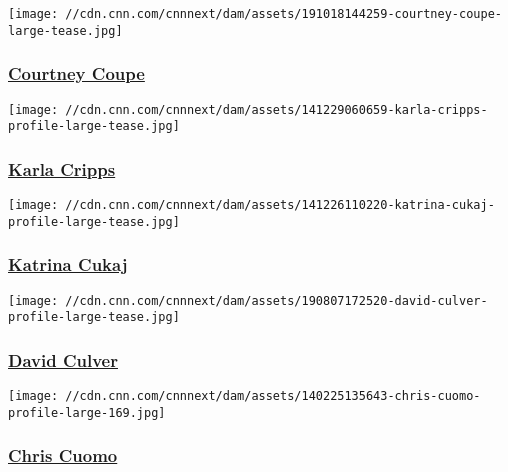 \href{/profiles/courtney-coupe}{}

\texttt{[image: //cdn.cnn.com/cnnnext/dam/assets/191018144259-courtney-coupe-large-tease.jpg]}

\hypertarget{courtney-coupe}{%
\subsubsection{\texorpdfstring{\href{/profiles/courtney-coupe}{Courtney
Coupe}}{Courtney Coupe}}\label{courtney-coupe}}

\href{/profiles/karla-cripps}{}

\texttt{[image: //cdn.cnn.com/cnnnext/dam/assets/141229060659-karla-cripps-profile-large-tease.jpg]}

\hypertarget{karla-cripps}{%
\subsubsection{\texorpdfstring{\href{/profiles/karla-cripps}{Karla
Cripps}}{Karla Cripps}}\label{karla-cripps}}

\href{/profiles/katrina-cukaj-profile}{}

\texttt{[image: //cdn.cnn.com/cnnnext/dam/assets/141226110220-katrina-cukaj-profile-large-tease.jpg]}

\hypertarget{katrina-cukaj}{%
\subsubsection{\texorpdfstring{\href{/profiles/katrina-cukaj-profile}{Katrina
Cukaj}}{Katrina Cukaj}}\label{katrina-cukaj}}

\href{/profiles/david-culver}{}

\texttt{[image: //cdn.cnn.com/cnnnext/dam/assets/190807172520-david-culver-profile-large-tease.jpg]}

\hypertarget{david-culver}{%
\subsubsection{\texorpdfstring{\href{/profiles/david-culver}{David
Culver}}{David Culver}}\label{david-culver}}

\href{/profiles/chris-cuomo-profile}{}

\texttt{[image: //cdn.cnn.com/cnnnext/dam/assets/140225135643-chris-cuomo-profile-large-169.jpg]}

\hypertarget{chris-cuomo}{%
\subsubsection{\texorpdfstring{\href{/profiles/chris-cuomo-profile}{Chris
Cuomo}}{Chris Cuomo}}\label{chris-cuomo}}

